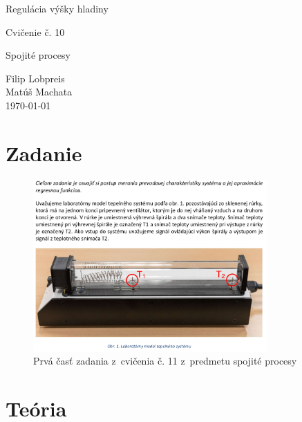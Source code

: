 \documentclass{article}
\begin{document}
\begin{titlepage}
	\null\vfill

	\begin{center}
		{\Huge Regulácia výšky hladiny }
		\vskip 2cm

		{\Large Cvičenie č. 10}
		\vskip 0.5cm

		{\large Spojité procesy}
	\end{center}

	\vfill
	\vfill

	\begin{flushright}
		Filip Lobpreis \\
		Matúš Machata \\
		\small\today\\
	\end{flushright}
	\hfill
\end{titlepage}

\thispagestyle{empty}
\clearpage

\tableofcontents
\thispagestyle{empty}
\clearpage

\section{Zadanie}
\label{sec:zadanie}

\begin{figure}[!htbp]
	\begin{center}
		\includegraphics[width=0.8\textwidth]{./include/zadanie.png}
	\end{center}
	\caption{Prvá časť zadania z~cvičenia č. 11 z~predmetu spojité procesy}
	\label{fig:zadanie1}
\end{figure}

\clearpage

\section{Teória}
\label{sec:teoria}
\end{document}
